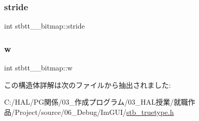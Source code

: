 \mbox{\label{structstbtt____bitmap_a48ee6b550ee4f1d85bfc32c62c0e9a98}} 
\subsubsection{\texorpdfstring{stride}{stride}}
{\footnotesize\ttfamily int stbtt\+\_\+\+\_\+bitmap\+::stride}

\mbox{\label{structstbtt____bitmap_afbd607426f0a457b1a871ed902eeb926}} 
\subsubsection{\texorpdfstring{w}{w}}
{\footnotesize\ttfamily int stbtt\+\_\+\+\_\+bitmap\+::w}



この構造体詳解は次のファイルから抽出されました\+:\begin{DoxyCompactItemize}
\item 
C\+:/\+H\+A\+L/\+P\+G関係/03\+\_\+作成プログラム/03\+\_\+\+H\+A\+L授業/就職作品/\+Project/source/06\+\_\+\+Debug/\+Im\+G\+U\+I/\mbox{\hyperlink{stb__truetype_8h}{stb\+\_\+truetype.\+h}}\end{DoxyCompactItemize}
